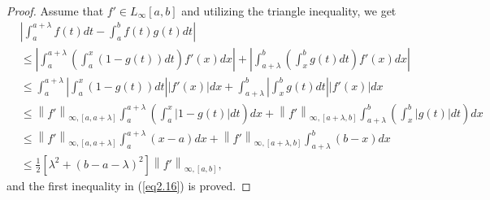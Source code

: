 \documentclass{amsart}
\theoremstyle{plain}
\numberwithin{equation}{section}
\begin{document}
\begin{proof}
Assume that $f' \in L_{\infty}[a,b]$ and utilizing the triangle
inequality, we get
\begin{align*}
&\left| {\int_a^{a + \lambda } {f\left( t \right)dt}  - \int_a^b
{f\left( t \right)g\left( t \right)dt} } \right|
\\
&\le \left| {\int_a^{a + \lambda } {\left( {\int_a^x {\left( {1 -
g\left( t \right)} \right)dt} } \right)f'\left( x \right)dx} }
\right|+ \left| {\int_{a + \lambda }^b {\left( {\int_x^b {g\left(
t \right)dt} } \right)f'\left( x \right)dx} } \right|
\\
&\le \int_a^{a + \lambda } { \left| {\int_a^x {\left( {1 - g\left(
t \right)} \right)dt} } \right|\left| {f'\left( x \right)}
\right|dx} + \int_{a + \lambda }^b {\left| {\int_x^b {g\left( t
\right)dt} } \right| \left| {f'\left( x \right)} \right| dx}
\\
&\le  \left\| {f'} \right\|_{\infty ,\left[ {a,a + \lambda }
\right]}\int_a^{a + \lambda } { \left( {\int_a^x {\left| {1 -
g\left( t \right)} \right|dt}} \right)dx} + \left\| {f'}
\right\|_{\infty ,\left[ {a + \lambda ,b} \right]} \int_{a +
\lambda }^b {\left( {\int_x^b {\left| {g\left( t \right)}
\right|dt} } \right)dx}
\\
&\le  \left\| {f'} \right\|_{\infty ,\left[ {a,a + \lambda }
\right]}\int_a^{a + \lambda } { \left( {x - a} \right)dx} +
\left\| {f'} \right\|_{\infty ,\left[ {a + \lambda ,b} \right]}
\int_{a + \lambda }^b {\left( {b - x } \right)dx}
\\
&\le  \frac{1}{2}\left[ {\lambda ^2  + \left( {b - a - \lambda }
\right)^2 } \right] \left\| {f'} \right\|_{\infty ,\left[ {a,b}
\right]},
\end{align*}
and the first inequality in  (\ref{eq2.16}) is proved.


\end{proof}
\end{document}
